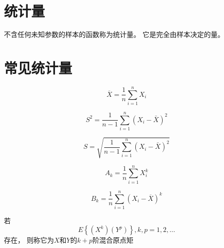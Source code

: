 \section{统计量}

不含任何未知参数的样本的函数称为统计量。
它是完全由样本决定的量。

\section{常见统计量}

\begin{definition}[样本平均值]
    \begin{equation}\overline{X}=\frac{1}{n} \sum_{i=1}^{n} X_{i}\end{equation}
\end{definition}

\begin{definition}[样本方差]
    \begin{equation}S^{2}=\frac{1}{ n-1} \sum_{i=1}^{n}\left(X_{i}-\bar{X}\right)^{2}\end{equation}
\end{definition}

\begin{definition}[样本标准差]
    \begin{equation}S=\sqrt{\frac{1}{ { n-1} } \sum_{i=1}^{n}\left(X_{i}-\bar{X}\right)^{2}}\end{equation}
\end{definition}

\begin{definition}[样本 $k$ 阶原点矩]
    \begin{equation}A_{k}=\frac{1}{n} \sum_{i=1}^{n} X_{i}^{k}\end{equation}
\end{definition}

\begin{definition}[样本 $k$ 阶中心矩]
    \begin{equation}{B}_{{k}}=\frac{1}{{n}} \sum_{i=1}^{n}\left({X}_{i}-\overline{{X}}\right)^{k}\end{equation}
\end{definition}

\begin{definition}[$X$和$Y$的$k+p$阶混合原点矩]
    若
    \begin{equation}E \left\{\left(X^ k\right)\left(Y^ p\right)\right\}, k, p=1,2, \ldots \end{equation}
    存在， 则称它为$X$和$Y$的$k+p$阶混合原点矩
\end{definition}

